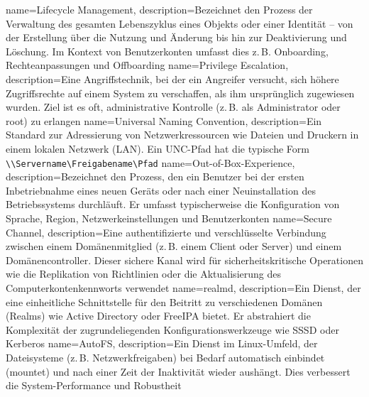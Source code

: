 {
	name={Li\-fe\-cy\-cle Ma\-nage\-ment},
	description={Be\-zeich\-net den Pro\-zess der Ver\-wal\-tung des ge\-sam\-ten Le\-bens\-zy\-klus ei\-nes Ob\-jekts oder ei\-ner Iden\-ti\-tät -- von der Er\-stel\-lung über die Nut\-zung und Än\-de\-rung bis hin zur De\-ak\-ti\-vie\-rung und Lö\-schung. Im Kon\-text von Be\-nut\-zer\-kon\-ten um\-fasst dies z.\,B. On\-boar\-ding, Rech\-te\-an\-pas\-sun\-gen und Off\-boar\-ding}
}
{
	name={Pri\-vi\-le\-ge Es\-ca\-la\-ti\-on},
	description={Eine An\-griffs\-tech\-nik, bei der ein An\-grei\-fer ver\-sucht, sich hö\-he\-re Zu\-griffs\-rech\-te auf ei\-nem Sys\-tem zu ver\-schaf\-fen, als ihm ur\-sprüng\-lich zu\-ge\-wie\-sen wur\-den. Ziel ist es oft, ad\-mi\-nis\-tra\-ti\-ve Kon\-trol\-le (z.\,B. als Ad\-mi\-nis\-tra\-tor oder root) zu er\-lan\-gen}
}
{
	name={Uni\-ver\-sal Na\-ming Con\-ven\-ti\-on},
	description={Ein Stan\-dard zur Adres\-sie\-rung von Netz\-werk\-res\-sour\-cen wie Da\-tei\-en und Dru\-ckern in ei\-nem lo\-ka\-len Netz\-werk (LAN). Ein UNC-Pfad hat die ty\-pi\-sche Form \texttt{\textbackslash\textbackslash Ser\-ver\-na\-me\textbackslash Frei\-ga\-be\-na\-me\textbackslash Pfad}}
}
{
	name={Out-of-Box-Ex\-pe\-ri\-ence},
	description={Be\-zeich\-net den Pro\-zess, den ein Be\-nut\-zer bei der ers\-ten In\-be\-trieb\-nah\-me ei\-nes neu\-en Ge\-räts oder nach ei\-ner Neu\-in\-stal\-la\-ti\-on des Be\-triebs\-sys\-tems durch\-läuft. Er um\-fasst ty\-pi\-scher\-wei\-se die Kon\-fi\-gu\-ra\-ti\-on von Spra\-che, Re\-gi\-on, Netz\-werk\-ein\-stel\-lun\-gen und Be\-nut\-zer\-kon\-ten}
}
{
	name={Se\-cure Chan\-nel},
	description={Eine au\-then\-ti\-fi\-zier\-te und ver\-schlüs\-sel\-te Ver\-bin\-dung zwi\-schen ei\-nem Do\-mä\-nen\-mit\-glied (z.\,B. ei\-nem Cli\-ent oder Ser\-ver) und ei\-nem Do\-mä\-nen\-con\-trol\-ler. Die\-ser si\-che\-re Ka\-nal wird für si\-cher\-heits\-kri\-ti\-sche Ope\-ra\-tio\-nen wie die Re\-pli\-ka\-ti\-on von Richt\-li\-ni\-en oder die Ak\-tua\-li\-sie\-rung des Com\-pu\-ter\-kon\-ten\-kenn\-worts ver\-wen\-det}
}
{
	name={realm\-d},
	description={Ein Dienst, der eine ein\-heit\-li\-che Schnitt\-stel\-le für den Bei\-tritt zu ver\-schie\-de\-nen Do\-mä\-nen (Realms) wie Ac\-tive Di\-rec\-to\-ry oder FreeIPA bie\-tet. Er ab\-stra\-hiert die Kom\-ple\-xi\-tät der zu\-grun\-de\-lie\-gen\-den Kon\-fi\-gu\-ra\-ti\-ons\-werk\-zeu\-ge wie SSSD oder Ker\-be\-ros}
}
{
	name={Au\-toFS},
	description={Ein Dienst im Li\-nux-Um\-feld, der Da\-tei\-sys\-te\-me (z.\,B. Netz\-werk\-frei\-ga\-ben) bei Be\-darf au\-to\-ma\-tisch ein\-bin\-det (moun\-tet) und nach ei\-ner Zeit der In\-ak\-ti\-vi\-tät wie\-der aus\-hängt. Dies ver\-bes\-sert die Sys\-tem-Per\-for\-mance und Ro\-bust\-heit}
}
